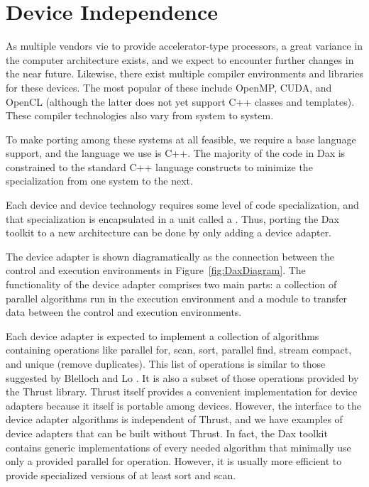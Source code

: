 \section{Device Independence}
\label{sec:DeviceIndependence}

As multiple vendors vie to provide accelerator-type processors, a great
variance in the computer architecture exists, and we expect to encounter
further changes in the near future. Likewise, there exist multiple compiler
environments and libraries for these devices. The most popular of these
include OpenMP, CUDA, and OpenCL (although the latter does not yet support
C++ classes and templates). These compiler technologies also vary from
system to system.

To make porting among these systems at all feasible, we require a base
language support, and the language we use is C++. The majority of the code
in Dax is constrained to the standard C++ language constructs to minimize
the specialization from one system to the next.


Each device and device technology requires some level of code
specialization, and that specialization is encapsulated in a unit called a
. Thus, porting the Dax toolkit to a new
architecture can be done by only adding a device adapter.

The device adapter is shown diagramatically as
the connection between the control and execution environments in
Figure~\ref{fig:DaxDiagram}. The functionality of the device adapter
comprises two main parts: a collection of parallel algorithms run in the
execution environment and a module to transfer data between the control and
execution environments.

Each device adapter is expected to implement a collection of algorithms
containing operations like parallel for, scan, sort, parallel find, stream
compact, and unique (remove duplicates). This list of operations is similar
to those suggested by Blelloch and Lo
\etal{}. It is also a subset of those operations provided by
the Thrust library. Thrust itself provides a convenient
implementation for device adapters because it itself is portable among
devices. However, the interface to the device adapter algorithms is
independent of Thrust, and we have examples of device adapters that can be
built without Thrust. In fact, the Dax toolkit contains generic
implementations of every needed algorithm that minimally use only a
provided parallel for operation. However, it is usually more efficient to
provide specialized versions of at least sort and scan.

